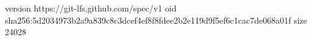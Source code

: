 version https://git-lfs.github.com/spec/v1
oid sha256:5d2034973b2a9a839c8c3dcef4ef8f8fdee2b2e119d9f5ef6c1cac7de068a01f
size 24028

